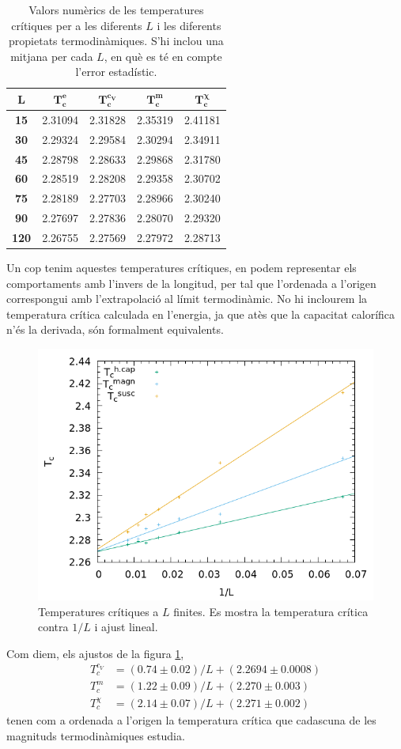 \documentclass[a4paper]{article}
\begin{document}
\begin{table}[H]
\centering
\begin{tabular}{ccccc}
\hline
$\mathbf{L}$ & $\mathbf{T_c^e}$ & $\mathbf{T_c^{c_V}}$ & $\mathbf{T_c^m}$ & $\mathbf{T_c^\chi}$ \\ \hline
\textbf{15} & 2.31094 & 2.31828 & 2.35319 & 2.41181 \\
\textbf{30} & 2.29324 & 2.29584 & 2.30294 & 2.34911 \\
\textbf{45} & 2.28798 & 2.28633 & 2.29868 & 2.31780 \\
\textbf{60} & 2.28519 & 2.28208 & 2.29358 & 2.30702 \\
\textbf{75} & 2.28189 & 2.27703 & 2.28966 & 2.30240 \\
\textbf{90} & 2.27697 & 2.27836 & 2.28070 & 2.29320 \\
\textbf{120} & 2.26755 & 2.27569 & 2.27972 & 2.28713
\end{tabular}
\caption{Valors numèrics de les temperatures crítiques per a les diferents $L$ i les diferents propietats termodinàmiques. S'hi inclou una mitjana per cada $L$, en què es té en compte l'error estadístic.}
\label{tab:tcs}
\end{table}

Un cop tenim aquestes temperatures crítiques, en podem representar els comportaments amb l'invers de la longitud, per tal que l'ordenada a l'origen correspongui amb l'extrapolació al límit termodinàmic. No hi inclourem la temperatura crítica calculada en l'energia, ja que atès que la capacitat calorífica n'és la derivada, són formalment equivalents.
\begin{figure}[H]
    \centering
    \includegraphics[width=.6\textwidth]{coefs-tc.png}
    \caption{Temperatures crítiques a $L$ finites. Es mostra la temperatura crítica contra $1/L$ i ajust lineal.}
    \label{fig:tc}
\end{figure}

Com diem, els ajustos de la figura \ref{fig:tc},
\begin{align*}
    T_c^{c_V} &= (0.74 \pm 0.02)/L + (2.2694 \pm 0.0008) \\
    T_c^{m} &= (1.22 \pm 0.09)/L + (2.270 \pm 0.003) \\
    T_c^{\chi} &= (2.14 \pm 0.07)/L + (2.271 \pm 0.002)
\end{align*}
tenen com a ordenada a l'origen la temperatura crítica que cadascuna de les magnituds termodinàmiques estudia.
\end{document}
